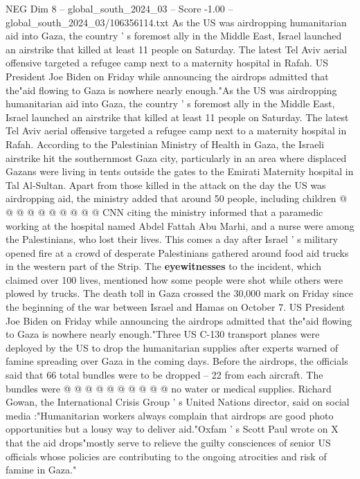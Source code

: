 \begin{textsample}{NEG Dim 8 – global\_south\_2024\_03 – Score -1.00 – global\_south\_2024\_03/106356114.txt}  \label{ex:f8_neg_359}
As the US was airdropping humanitarian aid into Gaza, the country ' s foremost ally in the Middle East, Israel launched an airstrike that killed at least 11 people on Saturday.
The latest Tel Aviv aerial offensive targeted a refugee camp next to a maternity hospital in Rafah.
US President Joe Biden on Friday while announcing the airdrops admitted that the"aid flowing to Gaza is nowhere nearly enough."As the US was airdropping humanitarian aid into Gaza, the country ' s foremost ally in the Middle East, Israel launched an airstrike that killed at least 11 people on Saturday.
The latest Tel Aviv aerial offensive targeted a refugee camp next to a maternity hospital in Rafah.
According to the Palestinian Ministry of Health in Gaza, the Israeli airstrike hit the southernmost Gaza city, particularly in an area where displaced Gazans were living in tents outside the gates to the Emirati Maternity hospital in Tal Al-Sultan.
Apart from those killed in the attack on the day the US was airdropping aid, the ministry added that around 50 people, including children @ @ @ @ @ @ @ @ @ @ CNN citing the ministry informed that a paramedic working at the hospital named Abdel Fattah Abu Marhi, and a nurse were among the Palestinians, who lost their lives.
This comes a day after Israel ' s military opened fire at a crowd of desperate Palestinians gathered around food aid trucks in the western part of the Strip.
The \textbf{eyewitnesses} to the incident, which claimed over 100 lives, mentioned how some people were shot while others were plowed by trucks.
The death toll in Gaza crossed the 30,000 mark on Friday since the beginning of the war between Israel and Hamas on October 7.
US President Joe Biden on Friday while announcing the airdrops admitted that the"aid flowing to Gaza is nowhere nearly enough."Three US C-130 transport planes were deployed by the US to drop the humanitarian supplies after experts warned of famine spreading over Gaza in the coming days.
Before the airdrops, the officials said that 66 total bundles were to be dropped -- 22 from each aircraft.
The bundles were @ @ @ @ @ @ @ @ @ @ no water or medical supplies.
Richard Gowan, the International Crisis Group ' s United Nations director, said on social media :"Humanitarian workers always complain that airdrops are good photo opportunities but a lousy way to deliver aid."Oxfam ' s Scott Paul wrote on X that the aid drops"mostly serve to relieve the guilty consciences of senior US officials whose policies are contributing to the ongoing atrocities and risk of famine in Gaza."

\end{textsample}
